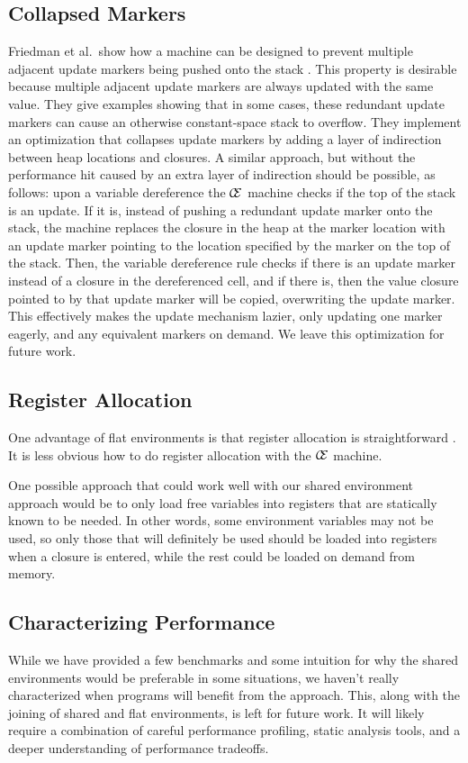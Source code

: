 \subsection{Collapsed Markers}
Friedman et al.\ show how a machine can be designed to prevent multiple adjacent
update markers being pushed onto the stack \cite{lkm}.  This property is
desirable because multiple adjacent update markers are always updated with the
same value. They give examples showing that in some cases, these redundant
update markers can cause an otherwise constant-space stack to overflow.  They
implement an optimization that collapses update markers by adding a layer of
indirection between heap locations and closures. A similar approach,
but without the performance hit caused by an extra layer of indirection should
be possible, as follows: upon a variable dereference the $\mathcal{\mathcal{C}
\mskip -4mu \mathcal{E}}$ machine checks if the top of the stack is an update.
If it is, instead of pushing a redundant update marker onto the stack, the
machine replaces the closure in the heap at the marker location with an update
marker pointing to the location specified by the marker on the top of the stack.
Then, the variable dereference rule checks if there is an update marker instead
of a closure in the dereferenced cell, and if there is, then the value closure
pointed to by that update marker will be copied, overwriting the update marker.
This effectively makes the update mechanism lazier, only updating one marker
eagerly, and any equivalent markers on demand.  We leave this optimization for
future work.

\subsection{Register Allocation} \label{sec:alloc}
One advantage of flat environments is that register allocation is
straightforward \cite{appel1992compiling,jonesstg,terei2010llvm}. It is less
obvious how to do register allocation with the $\mathcal{\mathcal{C} \mskip
-4mu \mathcal{E}}$ machine.  

One possible approach that could work well with our shared environment approach
would be to only load free variables into registers that are statically known to
be needed. In other words, some environment variables may not be used, so only
those that will definitely be used should be loaded into registers when a
closure is entered, while the rest could be loaded on demand from memory.

\subsection{Characterizing Performance}
While we have provided a few benchmarks and some intuition for why the shared
environments would be preferable in some situations, we haven't really
characterized when programs will benefit from the approach.  This, along with
the joining of shared and flat environments, is left for future work. It will
likely require a combination of careful performance profiling, static analysis
tools, and a deeper understanding of performance tradeoffs.

